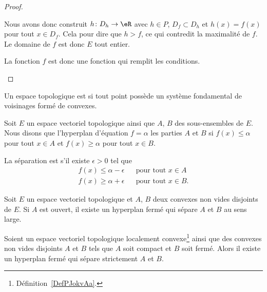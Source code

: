 \begin{proof}
\begin{subproof}
        Nous avons donc construit \( h\colon D_h\to \eR\) avec \( h\in P\), \( D_f\subset D_h\) et \( h(x)=f(x)\) pour tout \( x\in D_f\). Cela pour dire que \( h>f\), ce qui contredit la maximalité de \( f\). Le domaine de \( f\) est donc \( E\) tout entier.

        La fonction \( f\) est donc une fonction qui remplit les conditions.

    \end{subproof}
\end{proof}

\begin{definition}  \label{DefPJokvAa}
    Un espace topologique est  si tout point possède un système fondamental de voisinages formé de convexes.
\end{definition}

\begin{definition}
    Soit \( E\) un espace vectoriel topologique ainsi que \( A\), \( B\) des sous-ensembles de \( E\). Nous disons que l'hyperplan d'équation \( f=\alpha\)  les parties \( A\) et \( B\) si \( f(x)\leq \alpha\) pour tout \( x\in A\) et \( f(x)\geq \alpha\) pour tout \( x\in B\).

    La séparation est  s'il existe \( \epsilon>0\) tel que
    \begin{subequations}
        \begin{align}
            f(x)\leq \alpha-\epsilon&&\text{pour tout } x\in A\\
            f(x)\geq \alpha+\epsilon&&\text{pour tout } x\in B.
        \end{align}
    \end{subequations}
\end{definition}

\begin{theorem}  \label{ThoSAJjdZc}
    Soit \( E\) un espace vectoriel topologique et \( A\), \( B\) deux convexes non vides disjoints de \( E\). Si \( A\) est ouvert, il existe un hyperplan fermé qui sépare \( A\) et \( B\) au sens large.
\end{theorem}

\begin{theorem} \label{ThoACuKgtW}
    Soient un espace vectoriel topologique localement convexe\footnote{Définition~\ref{DefPJokvAa}.} ainsi que des convexes non vides disjoints \( A\) et \( B\) tels que \( A\) soit compact et \( B\) soit fermé. Alors il existe un hyperplan fermé qui sépare strictement \( A\) et \( B\).
\end{theorem}

